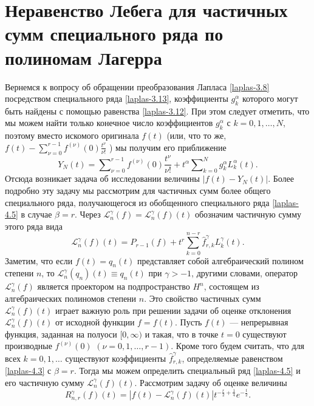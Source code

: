 \section{Неравенство Лебега для частичных сумм специального ряда  по полиномам Лагерра}\label{laplas6}
Вернемся к вопросу об обращении преобразования Лапласа \eqref{laplas-3.8} посредством специального ряда \eqref{laplas-3.13}, коэффициенты $g_k^\alpha$ которого могут быть найдены с помощью равенства  \eqref{laplas-3.12}. При этом следует отметить, что мы можем найти только конечное число  коэффициентов $g_k^\alpha$ с $k=0,1,\ldots, N$, поэтому вместо искомого оригинала $f(t)$ (или, что то же, $f(t)-\sum\nolimits_{\nu=0}^{r-1}f^{(\nu)}(0)\frac{t^\nu}{\nu!}$ ) мы получим его приближение
\begin{equation*}
Y_N(t)=\sum\nolimits_{\nu=0}^{r-1}f^{(\nu)}(0)\frac{t^\nu}{\nu!}+t^\alpha\sum\nolimits_{k=0}^{N} g_k^\alpha L_k^\alpha(t).
\end{equation*}
 Отсюда возникает задача об исследовании величины $|f(t)-Y_N(t)|$. Более подробно эту задачу мы рассмотрим для частичных сумм более общего специального ряда, получающегося из обобщенного специального ряда \eqref{laplas-4.5}  в случае $\beta=r$. Через $\mathcal{L}_n^\gamma(f)=\mathcal{L}_n^\gamma(f)(t)$ обозначим частичную сумму этого ряда  вида
\begin{equation*}
  \mathcal{L}_n^\gamma(f)(t)=P_{r-1}(f)+t^r\sum\limits_{k=0}^{n-r}\hat{f}_{r,k}^\gamma L_k^\gamma(t).
\end{equation*}
 Заметим, что если $f(t)=q_n(t)$ представляет собой алгебраический полином степени $n$, то
$\mathcal{L}_n^\gamma(q_n)(t)\equiv q_n(t)$ при $\gamma>-1$, другими словами, оператор $\mathcal{L}_n^\gamma(f)$ является проектором на подпространство $H^n$, состоящем из алгебраических полиномов степени $n$.
Это свойство частичных сумм  $\mathcal{L}_n^\gamma(f)(t)$ играет важную роль при решении задачи об оценке отклонения $\mathcal{L}_n^\gamma(f)(t)$ от исходной функции $f=f(t)$. Пусть $f(t)$ --- непрерывная функция, заданная на полуоси $[0,\infty)$ и такая, что в точке $t=0$ существуют производные $f^{(\nu)}(0)$ $(\nu=0,1,\dots,r-1)$. Кроме того будем считать, что для всех $k=0,1,\ldots$ существуют коэффициенты $\hat{f}_{r,k}^\gamma$, определяемые равенством \eqref{laplas-4.3} с $\beta=r$. Тогда мы можем определить специальный ряд \eqref{laplas-4.5} и его частичную сумму $\mathcal{L}_n^\gamma(f)(t)$. Рассмотрим задачу об оценке величины
\begin{equation}\label{laplas-6.1}
  R_{n,r}^\gamma(f)(t)=|f(t)-\mathcal{L}_n^\gamma(f)(t)|t^{-\frac r2+\frac14}e^{-\frac t2}.
\end{equation}
